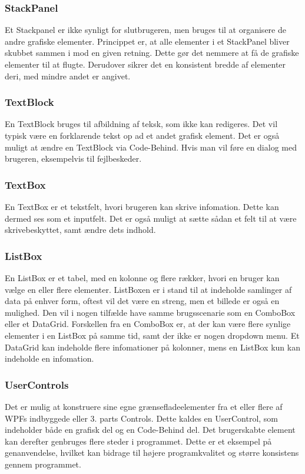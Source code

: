 \subsubsection*{StackPanel}
Et Stackpanel er ikke synligt for slutbrugeren, men bruges til at organisere de andre grafiske elementer.
Princippet er, at alle elementer i et StackPanel bliver skubbet sammen i mod en given retning.
Dette gør det nemmere at få de grafiske elementer til at flugte.
Derudover sikrer det en konsistent bredde af elementer deri, med mindre andet er angivet.

\subsubsection*{TextBlock}
En TextBlock bruges til afbildning af teksk, som ikke kan redigeres.
Det vil typisk være en forklarende tekst op ad et andet grafisk element.
Det er også muligt at ændre en TextBlock via Code-Behind. 
Hvis man vil føre en dialog med brugeren, eksempelvis til fejlbeskeder.

\subsubsection*{TextBox}
En TextBox er et tekstfelt, hvori brugeren kan skrive infomation. 
Dette kan dermed ses som et inputfelt. 
Det er også muligt at sætte sådan et felt til at være skrivebeskyttet, samt ændre dets indhold.

\subsubsection*{ListBox}
En ListBox er et tabel, med en kolonne og flere rækker, hvori en bruger kan vælge en eller flere elementer.
ListBoxen er i stand til at indeholde samlinger af data på enhver form, oftest vil det være en streng, men et billede er også en mulighed.
Den vil i nogen tilfælde have samme brugsscenarie som en ComboBox eller et DataGrid. 
Forskellen fra en ComboBox er, at der kan være flere synlige elementer i en ListBox på samme tid, samt der ikke er nogen dropdown menu.
Et DataGrid kan indeholde flere infomationer på kolonner, mens en ListBox kun kan indeholde en infomation.

\subsubsection*{UserControls}
Det er mulig at konstruere sine egne grænsefladeelementer fra et eller flere af WPFs indbyggede eller 3. parts Controls.
Dette kaldes en UserControl, som indeholder både en grafisk del og en Code-Behind del.
Det brugerskabte element kan derefter genbruges flere steder i programmet.
Dette er et eksempel på genanvendelse, hvilket kan bidrage til højere programkvalitet og større konsistens gennem programmet. 

\cbend